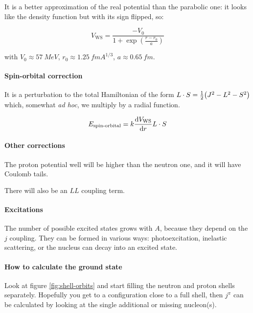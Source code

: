 \documentclass[main.tex]{subfiles}
\begin{document}
It is a better approximation of the real potential than the parabolic one: it looks like the density function but with its sign flipped, so:

\begin{equation}
    V_ \text{WS} = \frac{-V_0}{1+ \exp(\frac{r-r_0}{a})}
\end{equation}

with \(V_0 \approx \SI{57}{MeV} \), \(r_0 \approx \SI{1.25}{fm} A^{1/3}\), \(a \approx \SI{0.65}{fm} \).


\paragraph{Spin-orbital correction}

It is a perturbation to the total Hamiltonian of the form \(L \cdot S = \frac{1}{2} \qty(J^2 - L^2 - S^2)\) which, somewhat \emph{ad hoc}, we multiply by a radial function.

\begin{equation}
    E_{\text{spin-orbital}} = k \dv{V _ \text{WS}}{r} L \cdot S
\end{equation}

\paragraph{Other corrections}

The proton potential well will be higher than the neutron one, and it will have Coulomb tails.

There will also be an \(LL\) coupling term.

\paragraph{Excitations}

The number of possible excited states grows with \(A\), because they depend on the \(j\) coupling. They can be formed in various ways: photoexcitation, inelastic scattering, or the nucleus can decay into an excited state.

\paragraph{How to calculate the ground state}

Look at figure \ref{fig:shell-orbits} and start filling the neutron and proton shells separately. Hopefully you get to a configuration close to a full shell, then \(j^\pi\) can be calculated by looking at the single additional or missing nucleon(s).
\end{document}
